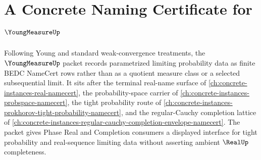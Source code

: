 \chapter{A Concrete Naming Certificate for $\YoungMeasureUp$}
\label{ch:concrete-instances-young-measure-namecert}

Following Young and standard weak-convergence treatments, the $\YoungMeasureUp$ packet records parametrized limiting probability data as finite BEDC NameCert rows rather than as a quotient measure class or a selected subsequential limit. It sits after the terminal real-name surface of \autoref{ch:concrete-instances-real-namecert}, the probability-space carrier of \autoref{ch:concrete-instances-probspace-namecert}, the tight probability route of \autoref{ch:concrete-instances-prokhorov-tight-probability-namecert}, and the regular-Cauchy completion lattice of \autoref{ch:concrete-instances-regular-cauchy-completion-envelope-namecert}. The packet gives Phase Real and Completion consumers a displayed interface for tight probability and real-sequence limiting data without asserting ambient $\RealUp$ completeness.

